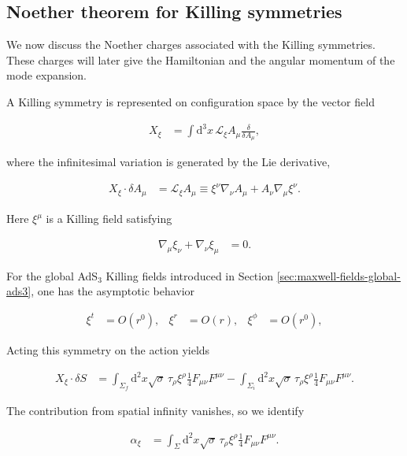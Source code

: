 \subsection{Noether theorem for Killing symmetries}\label{subsec:noether-killing-symmetries}

We now discuss the Noether charges associated with the Killing symmetries. These charges will later give the Hamiltonian and the angular momentum of the mode expansion.

A Killing symmetry is represented on configuration space by the vector field

\begin{align}
X_{\xi}&=\int \mathrm{d}^{3}x\,\mathcal{L}_{\xi}A_{\mu}\frac{\delta}{\delta A_{\mu}},
\end{align}

where the infinitesimal variation is generated by the Lie derivative,

\begin{align}
X_{\xi}\cdot \delta A_{\mu}&=\mathcal{L}_{\xi}A_{\mu}\equiv \xi ^{\nu}\nabla _{\nu}A_{\mu}+A_{\nu}\nabla _{\mu}\xi ^{\nu}.
\end{align}

Here $\xi^{\mu}$ is a Killing field satisfying

\begin{align}
\nabla _{\mu}\xi _{\nu}+\nabla _{\nu}\xi _{\mu}&=0.
\end{align}

For the global AdS$_3$ Killing fields introduced in Section \ref{sec:maxwell-fields-global-ads3}, one has the asymptotic behavior

\begin{align}
\xi ^{t}&=O(r^{0}), & \xi ^{r}&=O(r), & \xi ^{\phi}&=O(r^{0}),
\end{align}

Acting this symmetry on the action yields

\begin{align}
X_{\xi}\cdot \delta S & =\int _{\Sigma _{f}}\mathrm{d}^{2}x\sqrt{ \sigma }\,\tau _{\rho}\xi ^{\rho}\frac{1}{4}F_{\mu \nu}F^{\mu \nu}-\int _{\Sigma _{i}}\mathrm{d}^{2}x\sqrt{ \sigma }\,\tau _{\rho}\xi ^{\rho}\frac{1}{4}F_{\mu \nu}F^{\mu \nu}.
\end{align}

The contribution from spatial infinity vanishes, so we identify

\begin{align}
\alpha _{\xi}&=\int _{\Sigma}\mathrm{d}^{2}x\sqrt{ \sigma }\,\tau _{\rho}\xi ^{\rho}\frac{1}{4}F_{\mu \nu}F^{\mu \nu}.
\end{align}

